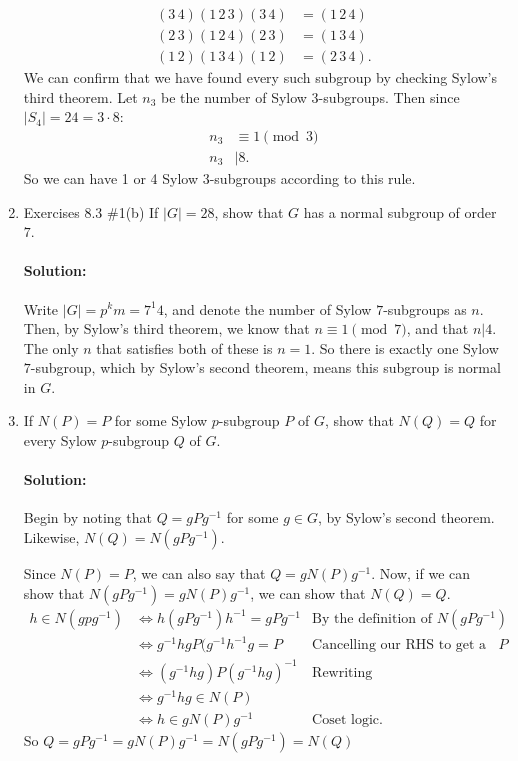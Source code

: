 \documentclass{article}
\begin{document}
\begin{enumerate}
    \begin{align*}
        (3\,4)(1\,2\,3)(3\,4)&= (1\,2\,4) \\
        (2\,3)(1\,2\,4)(2\,3)&= (1\,3\,4) \\
        (1\,2)(1\,3\,4)(1\,2)&= (2\,3\,4)
    .\end{align*}
    We can confirm that we have found every such subgroup by checking Sylow's third theorem. Let $n_3$ be the number of 
    Sylow 3-subgroups. Then since $|S_4|=24=3\cdot 8$:
    \begin{align*}
        n_3&\equiv 1\pmod{3} \\
        n_3 &|8
    .\end{align*}
    So we can have 1 or 4 Sylow 3-subgroups according to this rule. 

\item Exercises 8.3 \#1(b) If $|G|=28$, show that $G$ has a normal subgroup of order $7$.

    \paragraph{Solution: } Write $|G|=p^{k}m=7^1 4$, and denote the number of Sylow $7$-subgroups as $n$.
    Then, by Sylow's third theorem, we know that $n\equiv 1\pmod{7} $, and that $n|4$. The only $n$ that satisfies both of these is $n=1$.
    So there is exactly one Sylow $7$-subgroup, which by Sylow's second theorem, means this subgroup is normal in $G$.

\item If $N(P) = P$ for some Sylow $p$-subgroup $P$ of $G$, show that $N(Q) = Q$ for every Sylow $p$-subgroup $Q$ of $G$.

    \paragraph{Solution: } Begin by noting that $Q=gPg^{-1}$ for some $g\in G$, by Sylow's second theorem. Likewise, $N(Q)=N(gPg^{-1})$.

    Since $N(P)=P$, we can also say that $Q=gN(P)g^{-1}$. Now, if we can show that $N(gPg^{-1})=gN(P)g^{-1}$, we can show that $N(Q)=Q$.
    \begin{align*}
        h\in N(gpg^{-1})&\iff h(gPg^{-1})h^{-1}=gPg^{-1} &\text{By the definition of }N(gPg^{-1})\\
                        &\iff g^{-1}hgP(g^{-1}h^{-1}g=P&\text{Cancelling our RHS to get a lone }P\\
                        &\iff (g^{-1}hg)P(g^{-1}hg)^{-1}&\text{Rewriting}\\
                        &\iff g^{-1}hg\in N(P)\\
                        &\iff h\in gN(P)g^{-1} &\text{Coset logic}
    .\end{align*}
    So $Q=gPg^{-1}=gN(P)g^{-1}=N(gPg^{-1})=N(Q)$
\end{enumerate}
\end{document}
